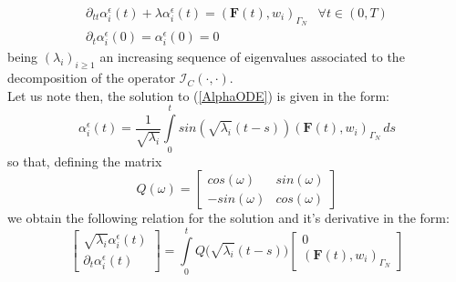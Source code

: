 \begin{enumerate}
    \begin{equation}
        \label{AlphaODE}
        \begin{array}{cc}
            \partial_{tt} \alpha_i^{\epsilon}(t) + \lambda \alpha_i^{\epsilon}(t) = (\mathbf{F}(t),w_i)_{\Gamma_N}& \forall t \in (0,T) \\
            \partial_t \alpha_i^{\epsilon}(0) = \alpha_i^{\epsilon}(0) = 0 & 
        \end{array}
    \end{equation}
    being $(\lambda_i)_{i \geq 1}$ an increasing sequence of eigenvalues associated to the decomposition of the operator $\mathcal{I}_C(\cdot, \cdot)$.\\
    Let us note then, the solution to (\ref{AlphaODE}) is given in the form:
    \begin{equation}
        \label{AlphaODEsol}
        \alpha_i^{\epsilon} (t) = \frac{1}{\sqrt{\lambda_i}} \int\limits_0^t sin(\sqrt{\lambda_i} (t-s)) (\mathbf{F}(t),w_i)_{\Gamma_N} \, ds
    \end{equation}
    so that, defining the matrix 
    \begin{equation*}
        Q(\omega) =
        \begin{bmatrix}
        cos(\omega) & sin(\omega) \\
        -sin(\omega) & cos(\omega)
        \end{bmatrix}
    \end{equation*}
    we obtain the following relation for the solution and it's derivative in the form:
    \begin{equation}
        \label{MatrixODEsol}
        \begin{bmatrix}
        \sqrt{\lambda_i} \alpha_i^{\epsilon}(t) \\
        \partial_{t} \alpha_i^{\epsilon}(t) 
        \end{bmatrix}
        = \int \limits_0^t Q\big(\sqrt{\lambda_i}(t-s)\big)
        \begin{bmatrix}
        0 \\
        (\mathbf{F}(t),w_i)_{\Gamma_N}
        \end{bmatrix}
    \end{equation}
    

\end{enumerate}
